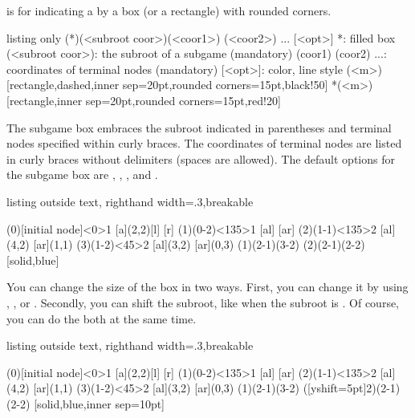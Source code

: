 \icmd{\xtSubgameBox} is for indicating a  by a box (or a rectangle) with rounded corners.

\begin{tcblisting}{listing only}
  \xtSubgame(*)(<subroot coor>){(<coor1>) (<coor2>) ... }[<opt>]
  *: filled box
  (<subroot coor>): the subroot of a subgame (mandatory)
  {(coor1) (coor2) ...}: coordinates of terminal nodes (mandatory)
  [<opt>]: color, line style
  (<m>){}[rectangle,dashed,inner sep=20pt,rounded corners=15pt,black!50]
  *(<m>){}[rectangle,inner sep=20pt,rounded corners=15pt,red!20]
\end{tcblisting}

The subgame box embraces the subroot indicated in parentheses and terminal nodes specified within curly braces.
The coordinates of terminal nodes are listed in curly braces without delimiters (spaces are allowed).
The default options for the subgame box are , , , and .

\begin{tcblisting}{listing outside text, righthand width=.3\linewidth,breakable}
\begin{istgame}
\xtdistance{15mm}{30mm}
\istroot[-135](0)[initial node]<0>{1}
  [a]{(2,2)}[l]           [r]  \endist 
\istroot(1)(0-2)<135>{1}
                   [al]  [ar]  \endist 
\xtdistance{10mm}{20mm}
\istroot(2)(1-1)<135>{2}
  \istb{\ell}[al]{(4,2)}  [ar]{(1,1)}  \endist 
\istroot(3)(1-2)<45>{2}
  \istb{\ell}[al]{(3,2)}  [ar]{(0,3)}  \endist 
\xtSubgameBox(1){(2-1)(3-2)}
\xtSubgameBox(2){(2-1)(2-2)}[solid,blue]
\end{istgame}
\end{tcblisting}

You can change the size of the box in two ways.
First, you can change it by using , , or . Secondly, you can shift the subroot, like  when the subroot is .
Of course, you can do the both at the same time.

\begin{tcblisting}{listing outside text, righthand width=.3\linewidth,breakable}
\begin{istgame}
\xtdistance{15mm}{30mm}
\istroot[-135](0)[initial node]<0>{1}
           [a]{(2,2)}[l]  [r]  \endist 
\istroot(1)(0-2)<135>{1}
                   [al]  [ar]  \endist 
\xtdistance{10mm}{20mm}
\istroot(2)(1-1)<135>{2}
  \istb{\ell}[al]{(4,2)}  [ar]{(1,1)}  \endist 
\istroot(3)(1-2)<45>{2}
  \istb{\ell}[al]{(3,2)}  [ar]{(0,3)}  \endist 
\xtSubgameBox(1){(2-1)(3-2)}
\xtSubgameBox([yshift=5pt]2){(2-1)(2-2)}%
    [solid,blue,inner sep=10pt]
\end{istgame}
\end{tcblisting}


